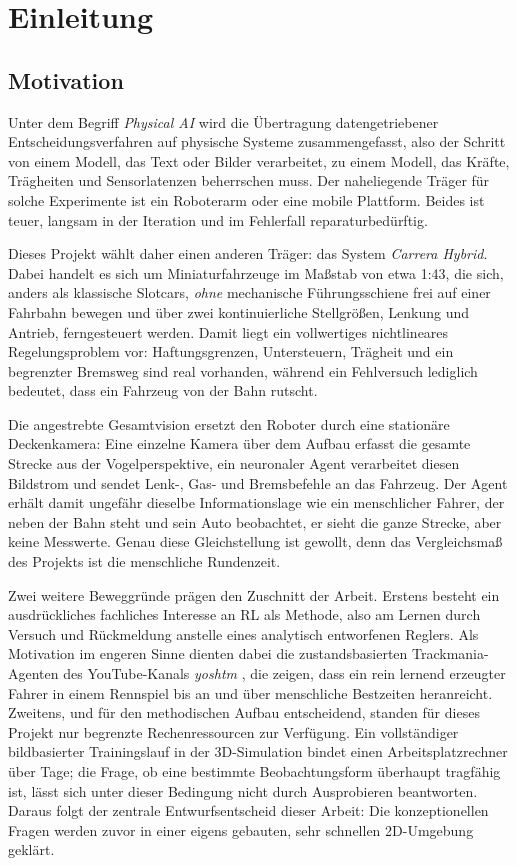 \chapter{Einleitung}
\label{chap:einleitung}

\section{Motivation}
\label{sec:motivation}

Unter dem Begriff \emph{Physical AI} wird die Übertragung datengetriebener Entscheidungsverfahren auf physische Systeme zusammengefasst, also der Schritt von einem Modell, das Text oder Bilder verarbeitet, zu einem Modell, das Kräfte, Trägheiten und Sensorlatenzen beherrschen muss. Der naheliegende Träger für solche Experimente ist ein Roboterarm oder eine mobile Plattform. Beides ist teuer, langsam in der Iteration und im Fehlerfall reparaturbedürftig.

Dieses Projekt wählt daher einen anderen Träger: das System \textit{Carrera Hybrid}. Dabei handelt es sich um Miniaturfahrzeuge im Maßstab von etwa 1:43, die sich, anders als klassische Slotcars, \emph{ohne} mechanische Führungsschiene frei auf einer Fahrbahn bewegen und über zwei kontinuierliche Stellgrößen, Lenkung und Antrieb, ferngesteuert werden. Damit liegt ein vollwertiges nichtlineares Regelungsproblem vor: Haftungsgrenzen, Untersteuern, Trägheit und ein begrenzter Bremsweg sind real vorhanden, während ein Fehlversuch lediglich bedeutet, dass ein Fahrzeug von der Bahn rutscht.

Die angestrebte Gesamtvision ersetzt den Roboter durch eine stationäre Deckenkamera: Eine einzelne Kamera über dem Aufbau erfasst die gesamte Strecke aus der Vogelperspektive, ein neuronaler Agent verarbeitet diesen Bildstrom und sendet Lenk-, Gas- und Bremsbefehle an das Fahrzeug. Der Agent erhält damit ungefähr dieselbe Informationslage wie ein menschlicher Fahrer, der neben der Bahn steht und sein Auto beobachtet, er sieht die ganze Strecke, aber keine Messwerte. Genau diese Gleichstellung ist gewollt, denn das Vergleichsmaß des Projekts ist die menschliche Rundenzeit.

Zwei weitere Beweggründe prägen den Zuschnitt der Arbeit. Erstens besteht ein ausdrückliches fachliches Interesse an \ac{RL} als Methode, also am Lernen durch Versuch und Rückmeldung anstelle eines analytisch entworfenen Reglers. Als Motivation im engeren Sinne dienten dabei die zustandsbasierten Trackmania-Agenten des YouTube-Kanals \textit{yoshtm} \cite{yoshtm}, die zeigen, dass ein rein lernend erzeugter Fahrer in einem Rennspiel bis an und über menschliche Bestzeiten heranreicht. Zweitens, und für den methodischen Aufbau entscheidend, standen für dieses Projekt nur begrenzte Rechenressourcen zur Verfügung. Ein vollständiger bildbasierter Trainingslauf in der 3D-Simulation bindet einen Arbeitsplatzrechner über Tage; die Frage, ob eine bestimmte Beobachtungsform überhaupt tragfähig ist, lässt sich unter dieser Bedingung nicht durch Ausprobieren beantworten. Daraus folgt der zentrale Entwurfsentscheid dieser Arbeit: Die konzeptionellen Fragen werden zuvor in einer eigens gebauten, sehr schnellen 2D-Umgebung geklärt.

